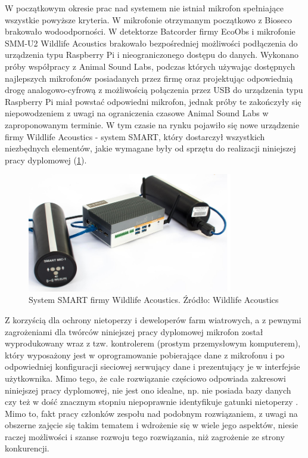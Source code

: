 \documentclass{sprz}
\begin{document}
W początkowym okresie prac nad systemem nie istniał mikrofon spełniające wszystkie powyższe kryteria. W mikrofonie otrzymanym początkowo z Bioseco brakowało wodoodporności. W detektorze Batcorder firmy EcoObs i mikrofonie SMM-U2 Wildlife Acoustics brakowało bezpośredniej możliwości podłączenia do urządzenia typu Raspberry Pi i nieograniczonego dostępu do danych. Wykonano próby współpracy z Animal Sound Labs, podczas których używając dostępnych najlepszych mikrofonów posiadanych przez firmę oraz projektując odpowiednią drogę analogowo-cyfrową z możliwością połączenia przez USB do urządzenia typu Raspberry Pi miał powstać odpowiedni mikrofon, jednak próby te zakończyły się niepowodzeniem z uwagi na ograniczenia czasowe Animal Sound Labs w zaproponowanym terminie. W tym czasie na rynku pojawiło się nowe urządzenie firmy Wildlife Acoustics - system SMART, który dostarczył wszystkich niezbędnych elementów, jakie wymagane były od sprzętu do realizacji niniejszej pracy dyplomowej (\ref{img:smart}). 

\begin{figure}[h]
  \centering
  \includegraphics[width=0.8\textwidth]{sprz/smart.png}
  \caption{System SMART firmy Wildlife Acoustics. Źródło: Wildlife Acoustics}
  \label{img:smart}
\end{figure} 

Z korzyścią dla ochrony nietoperzy i deweloperów farm wiatrowych, a z pewnymi zagrożeniami dla twórców niniejszej pracy dyplomowej mikrofon został wyprodukowany wraz z tzw. kontrolerem (prostym przemysłowym komputerem), który wyposażony jest w oprogramowanie pobierające dane z mikrofonu i po odpowiedniej konfiguracji sieciowej serwujący dane i prezentujący je w interfejsie użytkownika. Mimo tego, że całe rozwiązanie częściowo odpowiada zakresowi niniejszej pracy dyplomowej, nie jest ono idealne, np. nie posiada bazy danych czy też w dość znacznym stopniu niepoprawnie identyfikuje gatunki nietoperzy \cite{kaleidoscope-bias}. Mimo to, fakt pracy członków zespołu nad podobnym rozwiązaniem, z uwagi na obszerne zajęcie się takim tematem i wdrożenie się w wiele jego aspektów, niesie raczej możliwości i szanse rozwoju tego rozwiązania, niż zagrożenie ze strony konkurencji.
\end{document}
